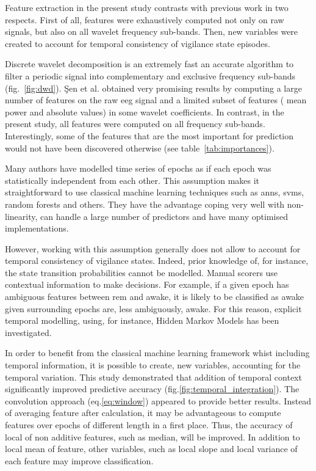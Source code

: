 Feature extraction in the present study contrasts with previous work in two respects.
First of all, features were exhaustively computed not only on raw signals,
but also on all wavelet frequency sub-bands.
Then, new variables were created to account for temporal consistency of vigilance state episodes.

Discrete wavelet decomposition is an extremely fast an accurate algorithm to filter a periodic
signal into complementary and exclusive frequency sub-bands (fig.~\ref{fig:dwd}).
\c{S}en et al.\cite{sen_comparative_2014} obtained very promising results by
computing a large number of features on the raw \gls{eeg} signal and a limited subset of features (\ie{} mean power and absolute values) in some wavelet coefficients.
In contrast, in the present study, all features were computed on all frequency sub-bands.
Interestingly, some of the features that are the most important for prediction would not have
been discovered otherwise (see table~\ref{tab:importances}).



Many authors have modelled time series of epochs as if each epoch was statistically independent from each other.
This assumption makes it straightforward to use classical machine learning techniques such as
\glspl{ann}, \glspl{svm}\cite{crisler_sleep-stage_2008},
random forests\cite{breiman_random_2001} and others.
They have the advantage coping very well with non-linearity, can handle a large number of predictors and have many optimised implementations.

However, working with this assumption generally does not allow to account for temporal consistency of vigilance states.
Indeed, prior knowledge of, for instance, the state transition probabilities cannot be modelled.
Manual scorers use contextual information to make decisions.
For example, if a given epoch has ambiguous features between \gls{rem} and awake,
it is likely to be classified as awake given surrounding epochs are, less ambiguously, awake.
For this reason, explicit temporal modelling, using, for instance, Hidden Markov Models has been investigated\cite{doroshenkov_classification_2007,pan_transition-constrained_2012}.

In order to benefit from the classical machine learning
framework whist including temporal information,
it is possible to create, new variables, accounting for the temporal
variation\cite{dietterich_machine_2002}.
This study demonstrated that addition of temporal context significantly improved predictive accuracy (fig.\ref{fig:temporal_integration}).
The convolution approach (eq.\ref{eq:window}) appeared to provide better results.
Instead of averaging feature after calculation, it may be advantageous to compute features over epochs of different length in a first place.
Thus, the accuracy of local of non additive features, such as median, will be improved. In addition to local mean of feature, other variables, such as local
slope and local variance of each feature may improve
classification\cite{deng_time_2013}.

